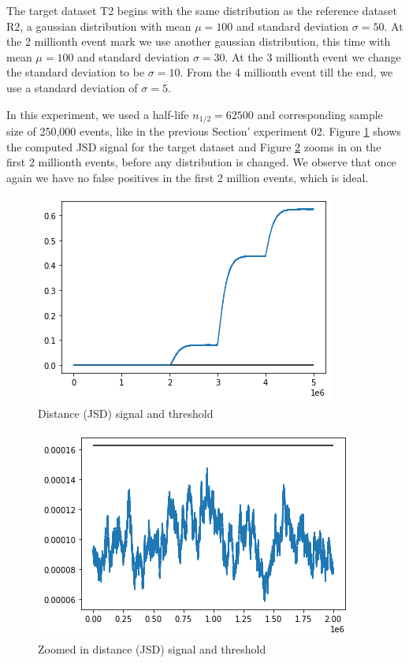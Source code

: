 The target dataset T2 begins with the same distribution as the reference dataset R2, a gaussian distribution with mean $\mu=100$ and standard deviation $\sigma=50$. At the 2 millionth event mark we use another gaussian distribution, this time with mean $\mu=100$ and standard deviation $\sigma=30$. At the 3 millionth event we change the standard deviation to be $\sigma=10$. From the 4 millionth event till the end, we use a standard deviation of $\sigma=5$. 

In this experiment, we used a half-life $n_{1/2}=62500$ and corresponding sample size of 250,000 events, like in the previous Section' experiment 02. Figure \ref{fig:JSD-signal-test02} shows the computed JSD signal for the target dataset and Figure \ref{fig:JSD-signal-zoom-test02} zooms in on the first 2 millionth events, before any distribution is changed. We observe that once again we have no false positives in the first 2 million events, which is ideal. 
\begin{figure}[!htb]
    \begin{center}
      \includegraphics[scale=0.6]{figures/stream-analysis-viz-test02.png}
      \caption[]{Distance (JSD) signal and threshold}
      \label{fig:JSD-signal-test02}
    \end{center}
\end{figure}
\begin{figure}[!htb]
    \begin{center}
      \includegraphics[scale=0.6]{figures/stream-analysis-viz-zoom-test02.png}
      \caption[]{Zoomed in distance (JSD) signal and threshold}
      \label{fig:JSD-signal-zoom-test02}
    \end{center}
\end{figure}
